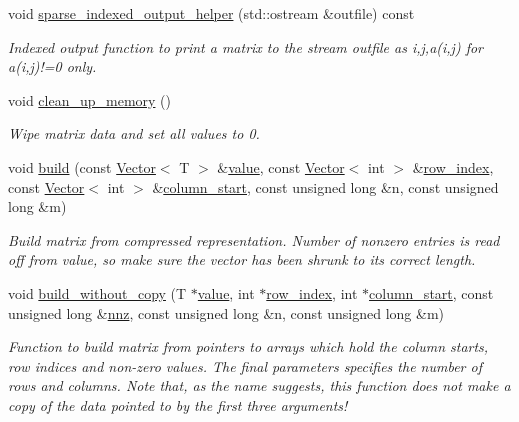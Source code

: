 \begin{DoxyCompactItemize}
void \hyperlink{classoomph_1_1CCMatrix_a1f6e451f0688c392e45bc03bf20fdda7}{sparse\+\_\+indexed\+\_\+output\+\_\+helper} (std\+::ostream \&outfile) const
\begin{DoxyCompactList}\small\item\em Indexed output function to print a matrix to the stream outfile as i,j,a(i,j) for a(i,j)!=0 only. \end{DoxyCompactList}\item 
void \hyperlink{classoomph_1_1CCMatrix_af3f7a40493a8576558e211c681b1ca3c}{clean\+\_\+up\+\_\+memory} ()
\begin{DoxyCompactList}\small\item\em Wipe matrix data and set all values to 0. \end{DoxyCompactList}\item 
void \hyperlink{classoomph_1_1CCMatrix_aa08192365e3c87357d1f7ca8131f03de}{build} (const \hyperlink{classoomph_1_1Vector}{Vector}$<$ T $>$ \&\hyperlink{classoomph_1_1SparseMatrix_a3e382ff145082821a6b0b3e63b6aed5d}{value}, const \hyperlink{classoomph_1_1Vector}{Vector}$<$ int $>$ \&\hyperlink{classoomph_1_1CCMatrix_acbea54ff48550342267246b7ae07c8c4}{row\+\_\+index}, const \hyperlink{classoomph_1_1Vector}{Vector}$<$ int $>$ \&\hyperlink{classoomph_1_1CCMatrix_a955390de47c08eb8799550519a1a2751}{column\+\_\+start}, const unsigned long \&n, const unsigned long \&m)
\begin{DoxyCompactList}\small\item\em Build matrix from compressed representation. Number of nonzero entries is read off from value, so make sure the vector has been shrunk to its correct length. \end{DoxyCompactList}\item 
void \hyperlink{classoomph_1_1CCMatrix_a57eddb79a6a3af698a1c92196482335a}{build\+\_\+without\+\_\+copy} (T $\ast$\hyperlink{classoomph_1_1SparseMatrix_a3e382ff145082821a6b0b3e63b6aed5d}{value}, int $\ast$\hyperlink{classoomph_1_1CCMatrix_acbea54ff48550342267246b7ae07c8c4}{row\+\_\+index}, int $\ast$\hyperlink{classoomph_1_1CCMatrix_a955390de47c08eb8799550519a1a2751}{column\+\_\+start}, const unsigned long \&\hyperlink{classoomph_1_1SparseMatrix_a8b8010edcc0869283621e72a9bbc51e3}{nnz}, const unsigned long \&n, const unsigned long \&m)
\begin{DoxyCompactList}\small\item\em Function to build matrix from pointers to arrays which hold the column starts, row indices and non-\/zero values. The final parameters specifies the number of rows and columns. Note that, as the name suggests, this function does not make a copy of the data pointed to by the first three arguments! \end{DoxyCompactList}\end{DoxyCompactItemize}
